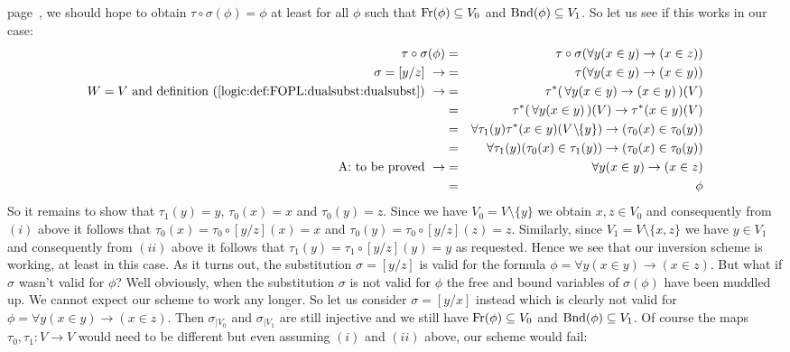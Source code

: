 page~\pageref{logic:def:FOPL:dualsubst:dualsubst}, we should hope to
obtain $\tau\circ\sigma(\phi)=\phi$ at least for all $\phi$ such
that $\mbox{\rm Fr}(\phi)\subseteq V_{0}$ and $\mbox{\rm Bnd}(\phi)\subseteq V_{1}$.
So let us see if this works in our case:
    \begin{eqnarray*}
    \tau\circ\sigma(\phi)&=&\tau\circ\sigma(\forall y(x\in y)\to(x\in
    z))\\
    \sigma=[y/z]\ \rightarrow&=&\tau(\forall y(x\in y)\to(x\in y))\\
    \mbox{$W=V$ and definition~(\ref{logic:def:FOPL:dualsubst:dualsubst})}\
    \rightarrow
    &=&\tau^{*}(\,\forall y(x\in y)\to(x\in y)\,)(V)\\
    &=&\tau^{*}(\,\forall y(x\in y)\,)(V)\to\tau^{*}(x\in y)(V)\\
    &=&\forall \tau_{1}(y)\tau^{*}(x\in
    y)(V\!\setminus\!\!\{y\})\to(\tau_{0}(x)\in\tau_{0}(y))\\
    &=&\forall\tau_{1}(y)(\tau_{0}(x)\in
    \tau_{1}(y))\to(\tau_{0}(x)\in\tau_{0}(y))\\
    \mbox{A: to be proved}\ \rightarrow&=&\forall y(x\in y)\to(x\in z)\\
    &=&\phi
    \end{eqnarray*}
So it remains to show that $\tau_{1}(y)=y$, $\tau_{0}(x)=x$ and
$\tau_{0}(y)=z$. Since we have $V_{0}=V\setminus\{y\}$ we obtain
$x,z\in V_{0}$ and consequently from $(i)$ above it follows that
$\tau_{0}(x)=\tau_{0}\circ[y/z](x)=x$ and
$\tau_{0}(y)=\tau_{0}\circ[y/z](z)=z$. Similarly, since
$V_{1}=V\setminus\{x,z\}$ we have $y\in V_{1}$ and consequently from
$(ii)$ above it follows that $\tau_{1}(y)=\tau_{1}\circ[y/z](y)=y$
as requested. Hence we see that our inversion scheme is working, at
least in this case. As it turns out, the substitution $\sigma=[y/z]$
is valid for the formula $\phi=\forall y(x\in y)\to(x\in z)$. But
what if $\sigma$ wasn't valid for $\phi$? Well obviously, when the
substitution $\sigma$ is not valid for $\phi$ the free and bound
variables of $\sigma(\phi)$ have been muddled up. We cannot expect
our scheme to work any longer. So let us consider $\sigma=[y/x]$
instead which is clearly not valid for $\phi=\forall y(x\in
y)\to(x\in z)$. Then $\sigma_{|V_{0}}$ and $\sigma_{|V_{1}}$ are
still injective and we still have $\mbox{\rm Fr}(\phi)\subseteq V_{0}$ and
$\mbox{\rm Bnd}(\phi)\subseteq V_{1}$. Of course the maps
$\tau_{0},\tau_{1}:V\to V$ would need to be different but even
assuming $(i)$ and $(ii)$ above, our scheme would fail:
